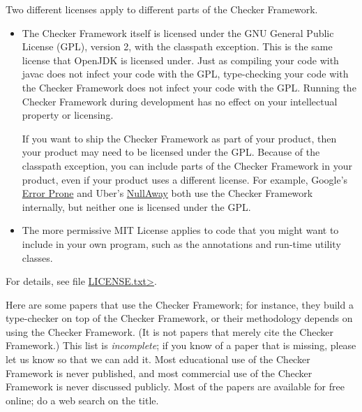 Two different licenses apply to different parts of the Checker Framework.
\begin{itemize}
\item
The Checker Framework itself is licensed under the GNU General Public License
(GPL), version 2, with the classpath exception.
This is the same license that OpenJDK is licensed
under.  Just as compiling your code with javac does not infect your code
with the GPL, type-checking your code with the Checker Framework does not
infect your code with the GPL\@.  Running the Checker Framework during
development has no effect on your intellectual property or licensing.

If you want to ship the Checker Framework as part of your product, then
your product may need to be licensed under the GPL\@.  Because of the
classpath exception, you can include parts of the Checker Framework in your
product, even if your product uses a different license.  For example,
Google's \href{https://github.com/google/error-prone}{Error Prone} and
Uber's \href{https://github.com/uber/NullAway}{NullAway} both use the
Checker Framework internally, but neither one is licensed under the GPL\@.

\item
The more permissive MIT License applies
to code that you might want to include in your own
program, such as the annotations and run-time utility classes.
\end{itemize}

\noindent
For details, see file
\href{https://raw.githubusercontent.com/eisop/checker-framework/master/LICENSE.txt}{\<LICENSE.txt>}.



Here are some papers that use the Checker Framework;
for instance, they build a type-checker on top of the Checker Framework, or
their methodology depends on using the Checker Framework.
(It is not papers that merely cite the Checker Framework.)
This list is \emph{incomplete}; if you know of a paper that
is missing, please let us know so that we can add it.
Most educational use of the Checker Framework is never published, and most
commercial use of the Checker Framework is never discussed publicly.
Most of the papers are available for free online; do a web search on the
title.

